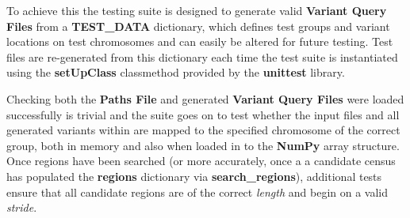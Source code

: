 To achieve this the testing suite is designed to generate valid
\textbf{Variant Query Files} from a \textbf{TEST\_DATA} dictionary, which
defines test groups and variant locations on test chromosomes and can easily be
altered for future testing. Test files are re-generated from this dictionary
each time the test suite is instantiated using the \textbf{setUpClass}
classmethod provided by the \textbf{unittest} library.

Checking both the \textbf{Paths File} and generated \textbf{Variant Query Files}
were loaded successfully is trivial and the suite goes on to test whether the
input files and all generated variants within are mapped to the specified
chromosome of the correct group, both in memory and also when loaded in to the
\textbf{NumPy} array structure. Once regions have been searched (or more
accurately, once a a candidate census has populated the \textbf{regions}
dictionary via \textbf{search\_regions}), additional tests ensure that all
candidate regions are of the correct \textit{length} and begin on a valid
\textit{stride}.

